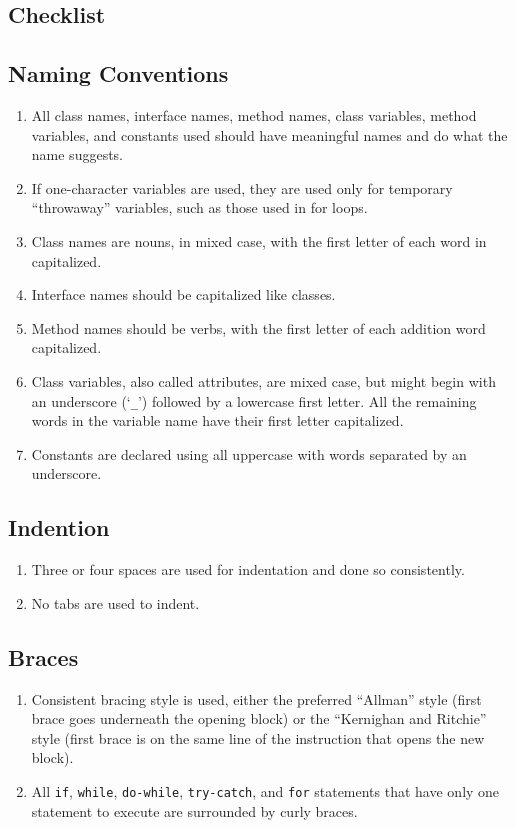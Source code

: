 \documentclass{scrreprt}
\begin{document}
\begin{appendix}

\chapter{Checklist}

\section*{Naming Conventions}
\begin{enumerate}
\item All class names, interface names, method names, class variables, method variables, and constants used should have meaningful names and do what the name suggests.
\item If one-character variables are used, they are used only for temporary “throwaway” variables, such as those used in for loops.
\item Class names are nouns, in mixed case, with the first letter of each word in capitalized.
\item Interface names should be capitalized like classes.
\item Method names should be verbs, with the first letter of each addition word capitalized.
\item Class variables, also called attributes, are mixed case, but might begin with an underscore (`\texttt{\_}') followed by a lowercase first letter. All the remaining words in the variable name have their first letter capitalized.
\item Constants are declared using all uppercase with words separated by an underscore.
\end{enumerate}

\section*{Indention}\begin{enumerate}[resume]
\item Three or four spaces are used for indentation and done so consistently.
\item No tabs are used to indent.
\end{enumerate}

\section*{Braces}\begin{enumerate}[resume]
\item Consistent bracing style is used, either the preferred “Allman” style (first brace goes underneath the opening block) or the “Kernighan and Ritchie” style (first brace is on the same line of the instruction that opens the new block).
\item All \texttt{if}, \texttt{while}, \texttt{do-while}, \texttt{try-catch}, and \texttt{for} statements that have only one statement to execute are surrounded by curly braces.
\end{enumerate}


\end{appendix}
\end{document}
